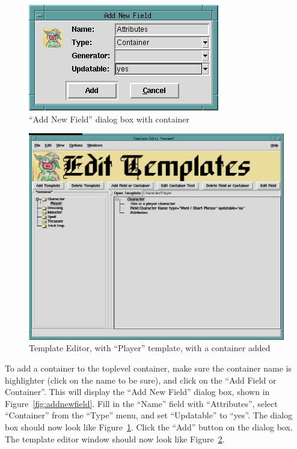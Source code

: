\begin{figure}[hbpt]
\begin{centering}
\includegraphics{AddNewFieldDialogWithContainer.png}
\caption{``Add New Field'' dialog box with container}
\label{fig:addnewcontainer}
\end{centering}
\end{figure}
\begin{figure}[hbpt]
\begin{centering}
\includegraphics[width=5in]{PlayerTemplateEditorWithContainer.png}
\caption{Template Editor, with ``Player'' template, with a container added}
\label{fig:playertemplateeditorwithcontainer}
\end{centering}
\end{figure}
To add a container to the toplevel container, make sure the container name
is highlighter (click on the name to be sure), and click on the ``Add
Field or Container''.  This will display the ``Add New Field'' dialog
box, shown in Figure~\ref{fig:addnewfield}.  Fill in the ``Name'' field
with ``Attributes'', select ``Container'' from the
``Type'' menu, and set ``Updatable'' to ``yes''.  The dialog box should
now look like Figure~\ref{fig:addnewcontainer}.  Click the ``Add''
button on the dialog box.  The template editor window should now look
like Figure~\ref{fig:playertemplateeditorwithcontainer}.

